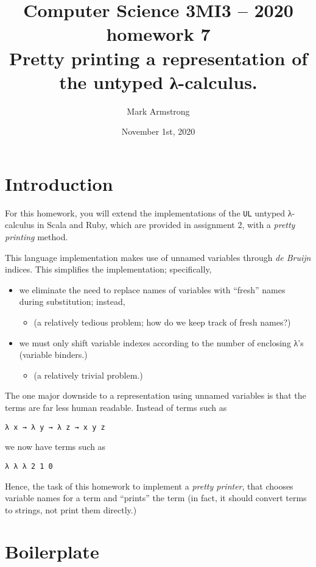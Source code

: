 \documentclass[11pt]{article}
\author{Mark Armstrong}
\date{November 1st, 2020}
\title{Computer Science 3MI3 – 2020 homework 7\\\medskip
\large Pretty printing a representation of the untyped λ-calculus.}
\begin{document}
\maketitle
\tableofcontents


\section*{Introduction}
\label{sec:org8f94955}
For this homework, you will extend the implementations
of the \texttt{UL} untyped λ-calculus in Scala and Ruby,
which are provided in assignment 2,
with a \emph{pretty printing} method.

This language implementation makes use of unnamed variables
through \emph{de Bruijn} indices.
This simplifies the implementation; specifically,
\begin{itemize}
\item we eliminate the need to replace names of variables
with “fresh” names during substitution; instead,
\begin{itemize}
\item (a relatively tedious problem;
how do we keep track of fresh names?)
\end{itemize}
\item we must only shift variable indexes according to the
number of enclosing λ's (variable binders.)
\begin{itemize}
\item (a relatively trivial problem.)
\end{itemize}
\end{itemize}

The one major downside to a representation using unnamed variables
is that the terms are far less human readable.
Instead of terms such as
\begin{verbatim}
λ x → λ y → λ z → x y z
\end{verbatim}
we now have terms such as
\begin{verbatim}
λ λ λ 2 1 0
\end{verbatim}

Hence, the task of this homework to implement a \emph{pretty printer},
that chooses variable names for a term and “prints” the term
(in fact, it should convert terms to strings,
not print them directly.)

\section*{Boilerplate}
\label{sec:orgc67caac}
\end{document}
